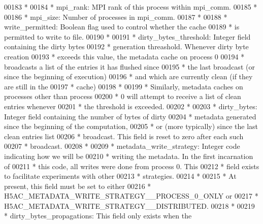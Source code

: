 \begin{DoxyCode}
00183 \textcolor{comment}{ *}
00184 \textcolor{comment}{ * mpi\_rank:    MPI rank of this process within mpi\_comm.}
00185 \textcolor{comment}{ *}
00186 \textcolor{comment}{ * mpi\_size:    Number of processes in mpi\_comm.}
00187 \textcolor{comment}{ *}
00188 \textcolor{comment}{ * write\_permitted:  Boolean flag used to control whether the cache}
00189 \textcolor{comment}{ *      is permitted to write to file.}
00190 \textcolor{comment}{ *}
00191 \textcolor{comment}{ * dirty\_bytes\_threshold: Integer field containing the dirty bytes}
00192 \textcolor{comment}{ *      generation threashold.  Whenever dirty byte creation}
00193 \textcolor{comment}{ *      exceeds this value, the metadata cache on process 0}
00194 \textcolor{comment}{ *      broadcasts a list of the entries it has flushed since}
00195 \textcolor{comment}{ *      the last broadcast (or since the beginning of execution)}
00196 \textcolor{comment}{ *      and which are currently clean (if they are still in the}
00197 \textcolor{comment}{ *      cache)}
00198 \textcolor{comment}{ *}
00199 \textcolor{comment}{ *      Similarly, metadata caches on processes other than process}
00200 \textcolor{comment}{ *      0 will attempt to receive a list of clean entries whenever}
00201 \textcolor{comment}{ *      the threshold is exceeded.}
00202 \textcolor{comment}{ *}
00203 \textcolor{comment}{ * dirty\_bytes:  Integer field containing the number of bytes of dirty}
00204 \textcolor{comment}{ *      metadata generated since the beginning of the computation,}
00205 \textcolor{comment}{ *      or (more typically) since the last clean entries list}
00206 \textcolor{comment}{ *      broadcast.  This field is reset to zero after each such}
00207 \textcolor{comment}{ *      broadcast.}
00208 \textcolor{comment}{ *}
00209 \textcolor{comment}{ * metadata\_write\_strategy: Integer code indicating how we will be }
00210 \textcolor{comment}{ *      writing the metadata.  In the first incarnation of }
00211 \textcolor{comment}{ *      this code, all writes were done from process 0.  This}
00212 \textcolor{comment}{ *      field exists to facilitate experiments with other }
00213 \textcolor{comment}{ *      strategies.}
00214 \textcolor{comment}{ *}
00215 \textcolor{comment}{ *      At present, this field must be set to either}
00216 \textcolor{comment}{ *      H5AC\_METADATA\_WRITE\_STRATEGY\_\_PROCESS\_0\_ONLY or }
00217 \textcolor{comment}{ *      H5AC\_METADATA\_WRITE\_STRATEGY\_\_DISTRIBUTED.}
00218 \textcolor{comment}{ *}
00219 \textcolor{comment}{ * dirty\_bytes\_propagations: This field only exists when the}

\end{DoxyCode}
